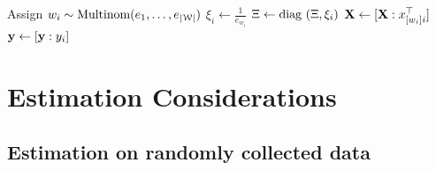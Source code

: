 \documentclass[letterpaper, 12pt, parskip=full,DIV=10]{scrartcl}
\begin{document}
\begin{algorithm}
\begin{algorithmic}[1]
		\EndIf
		\State Assign $w_i \sim \textrm{Multinom}( e_{1}, \dots,  e_{|{\EuScript W}|} )$ 
		\State $\xi_i \leftarrow \frac{ 1 }{e_{w_i}}$ 
		\State $\Xi \leftarrow {\textrm {diag} }\, \left(\Xi, \xi_i\right)$ 
		\State $\mathbf{X} \leftarrow [\mathbf{X}:x_{[w_i]i}^\top]$ 
		\State $\mathbf{y} \leftarrow  [\mathbf{y}: y_i]$ 
	\EndFor
    \end{algorithmic}
\end{algorithm}

\clearpage


\section{Estimation Considerations}
\subsection{Estimation on randomly collected data}\label{randomlearning}
\end{document}
